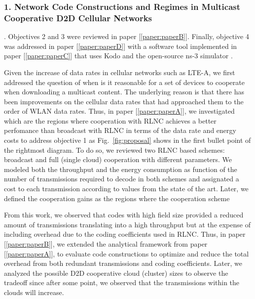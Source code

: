 \subsubsection{1. Network Code Constructions and Regimes in Multicast Cooperative D2D Cellular Networks}


. Objectives 2 and 3 were reviewed in paper {[\ref{paper:paperB}]}. Finally, objective 4 was addressed in paper {[\ref{paper:paperD}]} with a software tool implemented in paper {[\ref{paper:paperC}]} that uses Kodo and the open-source ns-3 simulator \cite{ns3link}.

Given the increase of data rates in cellular networks such as \ac{LTE-A}, we first addressed the question of when is it reasonable for a set of devices to cooperate when downloading a multicast content. The underlying reason is that there has been improvements on the cellular data rates that had approached them to the order of \ac{WLAN} data rates. Thus, in paper {[\ref{paper:paperA}]}, we investigated which are the regions where cooperation with \ac{RLNC} achieves a better perfomance than broadcast with \ac{RLNC} in terms of the data rate and energy costs to address objective 1 as Fig.~\ref{fig:proposal} shows in the first bullet point of the rightmost diagram. To do so, we reviewed two \ac{RLNC} based schemes: broadcast and full (single cloud) cooperation with different parameters. We modeled both the throughput and the energy consumption as function of the number of transmissions required to decode in both schemes and assignated a cost to each transmission according to values from the state of the art. Later, we defined the cooperation gains as the regions where the cooperation scheme





From this work, we observed that codes with high field size provided a reduced amount of transmissions translating into a high throughput but at the expense of including overhead due to the coding coefficients used in \ac{RLNC}. Thus, in paper {[\ref{paper:paperB}]}, we extended the analytical framework from paper {[\ref{paper:paperA}]}, to evaluate code constructions to optimize and reduce the total overhead from both redundant transmissions and coding coefficients. Later, we analyzed the possible \ac{D2D} cooperative cloud (cluster) sizes to observe the tradeoff since after some point, we observed that the transmissions within the clouds will increase.

